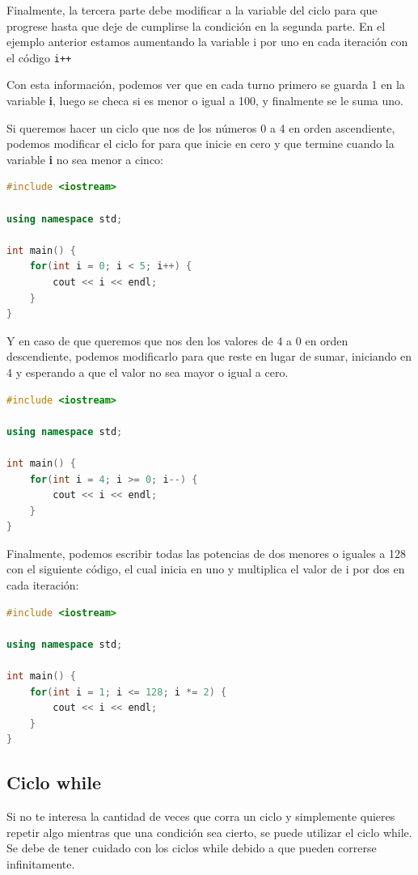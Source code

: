 \documentclass{article}
\begin{document}
Finalmente, la tercera parte debe modificar a la variable del ciclo para que progrese hasta que deje de cumplirse la condición en la segunda parte. En el ejemplo anterior estamos aumentando la variable i por uno en cada iteración con el código \lstinline{i++}

Con esta información, podemos ver que en cada turno primero se guarda 1 en la variable \textbf{i}, luego se checa si es menor o igual a 100, y finalmente se le suma uno.

Si queremos hacer un ciclo que nos de los números 0 a 4 en orden ascendiente, podemos modificar el ciclo for para que inicie en cero y que termine cuando la variable \textbf{i} no sea menor a cinco:

\begin{lstlisting}[language=C++, title=Ciclo for]
#include <iostream>

using namespace std;

int main() {
	for(int i = 0; i < 5; i++) {
		cout << i << endl;
	}
}
\end{lstlisting}

Y en caso de que queremos que nos den los valores de 4 a 0 en orden descendiente, podemos modificarlo para que reste en lugar de sumar, iniciando en 4 y esperando a que el valor no sea mayor o igual a cero.

\begin{lstlisting}[language=C++, title=Ciclo for]
#include <iostream>

using namespace std;

int main() {
	for(int i = 4; i >= 0; i--) {
		cout << i << endl;
	}
}
\end{lstlisting}

Finalmente, podemos escribir todas las potencias de dos menores o iguales a 128 con el siguiente código, el cual inicia en uno y multiplica el valor de i por dos en cada iteración:

\begin{lstlisting}[language=C++, title=Ciclo for]
#include <iostream>

using namespace std;

int main() {
	for(int i = 1; i <= 128; i *= 2) {
		cout << i << endl;
	}
}
\end{lstlisting}

\subsection{Ciclo while}

Si no te interesa la cantidad de veces que corra un ciclo y simplemente quieres repetir algo mientras que una condición sea cierto, se puede utilizar el ciclo while. Se debe de tener cuidado con los ciclos while debido a que pueden correrse infinitamente.
\end{document}
